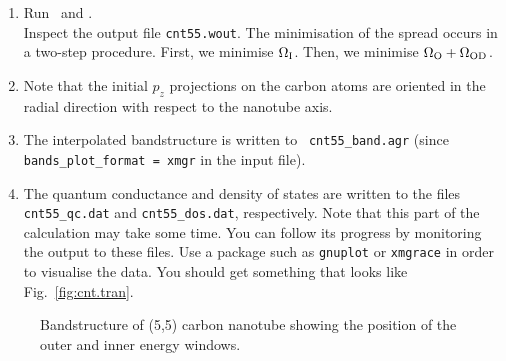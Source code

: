 \documentclass[a4paper,11pt,twoside]{article}
\begin{document}
\begin{enumerate}
\item Run \pwscf\ and \wannier.\\
Inspect the output file {\tt cnt55.wout}. The minimisation of the
spread occurs in a two-step procedure. First, we minimise $\Omega_{\rm
  I}$. Then, we minimise $\Omega_{\rm O}+\Omega_{{\rm OD}}$.
\item Note that the initial $p_{z}$ projections on the carbon atoms
are oriented in the radial direction with respect to the nanotube
axis.
\item The interpolated bandstructure is written to {\tt
cnt55\_band.agr} (since {\tt bands\_plot\_format = xmgr} in the input
file).
\item The quantum conductance and density of states are written to the
files {\tt cnt55\_qc.dat} and {\tt cnt55\_dos.dat}, respectively. 
Note that this part of the calculation may take some time. You can 
follow its progress by monitoring the output to these files. 
Use a package such as {\tt gnuplot} or {\tt xmgrace} in order to visualise
the data. You should get something that looks like Fig.~\ref{fig:cnt.tran}.
\end{enumerate}

\begin{figure}[h]
\begin{center}
\caption{Bandstructure of (5,5) carbon nanotube showing the position
  of the outer and inner energy windows.}
\label{fig:cnt.win}
\end{center}
\end{figure}
\end{document}
